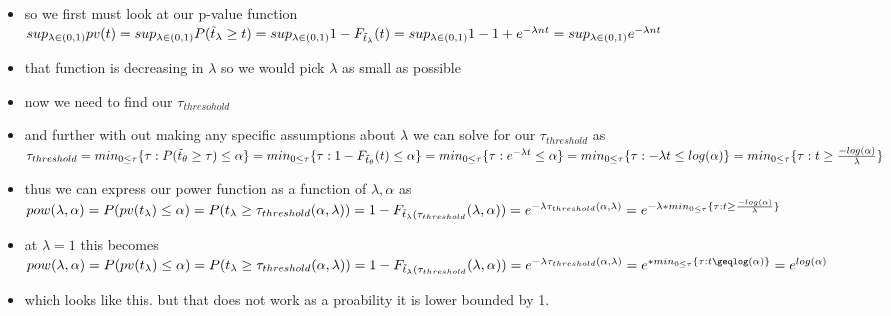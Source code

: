 \documentclass[12pt,twoside]{article}
\begin{document}
\begin{enumerate}
\begin{itemize}
\item so we first must look at our p-value function $sup_{\lambda\in (0,1)}pv(t)=sup_{\lambda\in (0,1)}P(\Tilde{t}_{\lambda}\geq t)=sup_{\lambda\in (0,1)}1-
F_{\Tilde{t}_{\lambda}}(t)=sup_{\lambda\in (0,1)}1-1+e^{-\lambda n t}=sup_{\lambda\in (0,1)}e^{-\lambda n t}$
\item that function is decreasing in $\lambda$ so we would pick $\lambda$ as small as possible
\item now we need to find our $\tau_{thresohold}$ 
\item and further with out making any specific assumptions about $\lambda$ we can solve for our $\tau_{threshold}$ as     $\tau_{threshold}=min_{0\leq \tau}\{\tau:P(\Tilde{t}_{\theta}\geq \tau)\leq \alpha\}=min_{0\leq \tau}\{\tau:1-F_{\Tilde{t}_{\theta}}(t)\leq \alpha\}=min_{0\leq \tau}\{\tau:e^{-\lambda t}\leq \alpha\}=min_{0\leq \tau}\{\tau:-\lambda t\leq log(\alpha)\}=min_{0\leq \tau}\{\tau:{t}\geq\frac{ -log(\alpha)}{\lambda}\}$ 
    \item thus we can express our power function as a function of $\lambda, \alpha $ as $pow(\lambda, \alpha)=P(pv(t_{\lambda})\leq \alpha)=P(t_{\lambda}\geq \tau_{threshold}(\alpha, \lambda))=1-F_{\Tilde{t}_{\lambda}(\tau_{threshold}}(\lambda ,\alpha))= e^{-\lambda \tau_{threshold}(\alpha, \lambda)}=e^{-\lambda * min_{0\leq \tau}\{\tau:{t}\geq\frac{-log(\alpha)}{\lambda}\}}$
    \item at $\lambda=1$ this becomes $pow(\lambda, \alpha)=P(pv(t_{\lambda})\leq \alpha)=P(t_{\lambda}\geq \tau_{threshold}(\alpha, \lambda))=1-F_{\Tilde{t}_{\lambda}(\tau_{threshold}}(\lambda ,\alpha))= e^{-\lambda \tau_{threshold}(\alpha, \lambda)}=e^{ * min_{0\leq \tau}\{\tau:{t}\geqlog(\alpha)\}}=e^{log(\alpha)}$
    \item which looks like this. but that does not work as a proability it is lower bounded by 1. 
\end{itemize}
\newpage





\end{enumerate}
\end{document}
